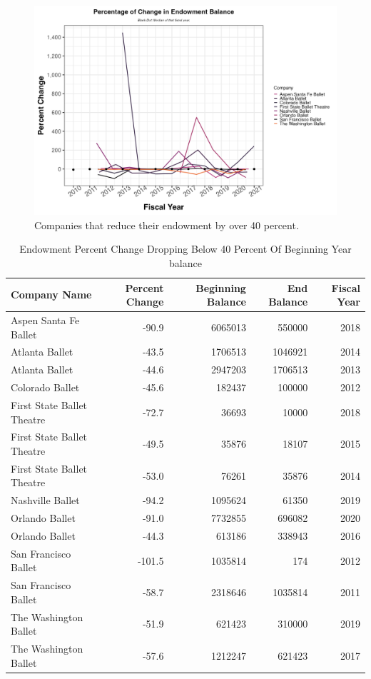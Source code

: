 \documentclass[Dance Data
Project,article,submit,moreauthors,pdftex]{mdpi}
\begin{document}
\begin{figure}[H]
\includegraphics[width=1\linewidth,]{../images/pc_below_40} \caption{\label{fig:below-40} Companies that reduce their endowment by over 40 percent.}\label{fig:unnamed-chunk-8}
\end{figure}

\begin{table}[!h]

\caption{Endowment Percent Change Dropping Below 40 Percent Of Beginning Year balance}
\centering
\begin{tabular}[t]{lrrrr}
\toprule
Company Name & Percent Change & Beginning Balance & End Balance & Fiscal Year\\
\midrule
Aspen Santa Fe Ballet & -90.9 & 6065013 & 550000 & 2018\\
\addlinespace
Atlanta Ballet & -43.5 & 1706513 & 1046921 & 2014\\
\addlinespace
Atlanta Ballet & -44.6 & 2947203 & 1706513 & 2013\\
\addlinespace
Colorado Ballet & -45.6 & 182437 & 100000 & 2012\\
\addlinespace
First State Ballet Theatre & -72.7 & 36693 & 10000 & 2018\\
\addlinespace
First State Ballet Theatre & -49.5 & 35876 & 18107 & 2015\\
\addlinespace
First State Ballet Theatre & -53.0 & 76261 & 35876 & 2014\\
\addlinespace
Nashville Ballet & -94.2 & 1095624 & 61350 & 2019\\
\addlinespace
Orlando Ballet & -91.0 & 7732855 & 696082 & 2020\\
\addlinespace
Orlando Ballet & -44.3 & 613186 & 338943 & 2016\\
\addlinespace
San Francisco Ballet & -101.5 & 1035814 & 174 & 2012\\
\addlinespace
San Francisco Ballet & -58.7 & 2318646 & 1035814 & 2011\\
\addlinespace
The Washington Ballet & -51.9 & 621423 & 310000 & 2019\\
\addlinespace
The Washington Ballet & -57.6 & 1212247 & 621423 & 2017\\
\bottomrule
\end{tabular}
\end{table}
\end{document}

